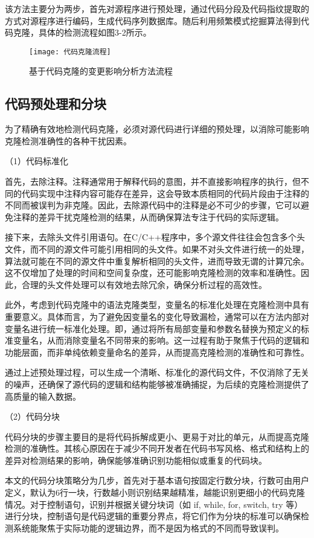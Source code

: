 该方法主要分为两步，首先对源程序进行预处理，通过代码分段及代码指纹提取的方式对源程序进行编码，生成代码序列数据库。随后利用频繁模式挖掘算法得到代码克隆，具体的检测流程如图3-2所示。

\begin{figure}[h]
\centering
\texttt{[image: 代码克隆流程]}
\caption{基于代码克隆的变更影响分析方法流程}
\end{figure}



\subsection{代码预处理和分块}

为了精确有效地检测代码克隆，必须对源代码进行详细的预处理，以消除可能影响克隆检测准确性的各种干扰因素。

（1）代码标准化

首先，去除注释。注释通常用于解释代码的意图，并不直接影响程序的执行，但不同的代码实现中注释内容可能存在差异，这会导致本质相同的代码片段由于注释的不同而被误判为非克隆。因此，去除源代码中的注释是必不可少的步骤，它可以避免注释的差异干扰克隆检测的结果，从而确保算法专注于代码的实际逻辑。

接下来，去除头文件引用语句。在C/C++程序中，多个源文件往往会包含多个头文件，而不同的源文件可能引用相同的头文件。如果不对头文件进行统一的处理，算法就可能在不同的源文件中重复解析相同的头文件，进而导致无谓的计算冗余。这不仅增加了处理的时间和空间复杂度，还可能影响克隆检测的效率和准确性。因此，合理的头文件处理可以有效地去除冗余，确保分析过程的高效性。

此外，考虑到代码克隆中的语法克隆类型，变量名的标准化处理在克隆检测中具有重要意义。具体而言，为了避免因变量名的变化导致漏检，通常可以在方法内部对变量名进行统一标准化处理。即，通过将所有局部变量和参数名替换为预定义的标准变量名，从而消除变量名不同带来的影响。这一过程有助于聚焦于代码的逻辑和功能层面，而非单纯依赖变量命名的差异，从而提高克隆检测的准确性和可靠性。

通过上述预处理过程，可以生成一个清晰、标准化的源代码文件，不仅消除了无关的噪声，还确保了源代码的逻辑和结构能够被准确捕捉，为后续的克隆检测提供了高质量的输入数据。

（2）代码分块

代码分块的步骤主要目的是将代码拆解成更小、更易于对比的单元，从而提高克隆检测的准确性。其核心原因在于减少不同开发者在代码书写风格、格式和结构上的差异对检测结果的影响，确保能够准确识别功能相似或重复的代码块。

本文的代码分块策略分为几步，首先对于基本语句按固定行数分块，行数可由用户定义，默认为6行一块，行数越小则识别结果越精准，越能识别更细小的代码克隆情况。对于控制语句，识别并根据关键分块词（如 if, while, for, switch, try 等）进行分块，控制语句是代码逻辑的重要分界点，将它们作为分块的标准可以确保检测系统能聚焦于实际功能的逻辑边界，而不是因为格式的不同而导致误判。

